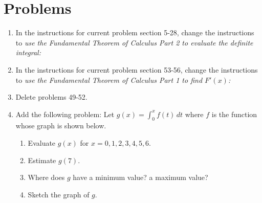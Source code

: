 \documentclass[11pt]{report}
\begin{document}
\section*{Problems}
\begin{enumerate}

\item In the instructions for current problem section 5-28, change the instructions to \emph{use the Fundamental Theorem of Calculus Part 2 to evaluate the definite integral:}

\item In the instructions for current problem section 53-56, change the instructions to \emph{use the Fundamental Theorem of Calculus Part 1 to find $F'(x)$:}

\item Delete problems 49-52.

\item Add the following problem: Let $g(x)=\int_0^x f(t)\,dt$ where $f$ is the function whose graph is shown below.
\begin{enumerate}
\item Evaluate $g(x)$ for $x=0,1,2,3,4,5,6$.
\item Estimate $g(7)$.
\item Where does $g$ have a minimum value? a maximum value?
\item Sketch the graph of $g$.
\end{enumerate}


\end{enumerate}
\end{document}
